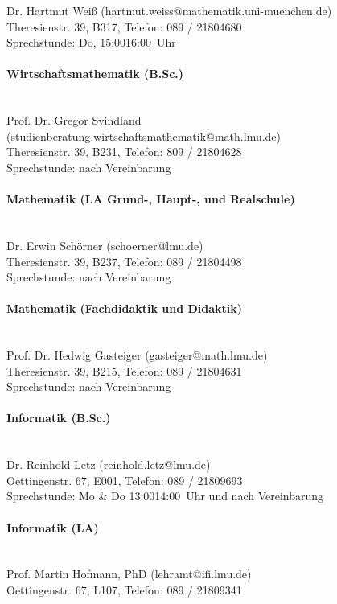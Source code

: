 \documentclass[twoside,12pt,parskip=half-]{scrartcl}
\newcommand{\emd}{\textendash}
\begin{document}
Dr. Hartmut Weiß (hartmut.weiss@mathematik.uni-muenchen.de)\\
Theresienstr. 39, B317, Telefon: 089 / 2180\emd{}4680\\
Sprechstunde: Do, 15:00\emd{}16:00~Uhr

\paragraph{Wirtschaftsmathematik (B.Sc.)}\hfill\\
Prof. Dr. Gregor Svindland (studienberatung.wirtschaftsmathematik@math.lmu.de)\\
Theresienstr. 39, B231, Telefon: 809 / 2180\emd{}4628\\
Sprechstunde: nach Vereinbarung

\paragraph{Mathematik (LA Grund-, Haupt-, und Realschule)}\hfill\\
Dr. Erwin Schörner (schoerner@lmu.de)\\
Theresienstr. 39, B237, Telefon: 089 / 2180\emd{}4498\\
Sprechstunde: nach Vereinbarung

\paragraph{Mathematik (Fachdidaktik und Didaktik)}\hfill\\
Prof. Dr. Hedwig Gasteiger (gasteiger@math.lmu.de)\\
Theresienstr. 39, B215, Telefon: 089 / 2180\emd{}4631\\
Sprechstunde: nach Vereinbarung

\paragraph{Informatik (B.Sc.)}\hfill\\
Dr. Reinhold Letz (reinhold.letz@lmu.de)\\
Oettingenstr. 67, E001, Telefon: 089 / 2180\emd{}9693\\
Sprechstunde: Mo \& Do 13:00\emd{}14:00~Uhr und nach Vereinbarung

\paragraph{Informatik (LA)}\hfill\\
Prof. Martin Hofmann, PhD (lehramt@ifi.lmu.de)\\
Oettingenstr. 67, L107, Telefon: 089 / 2180\emd{}9341
\end{document}
